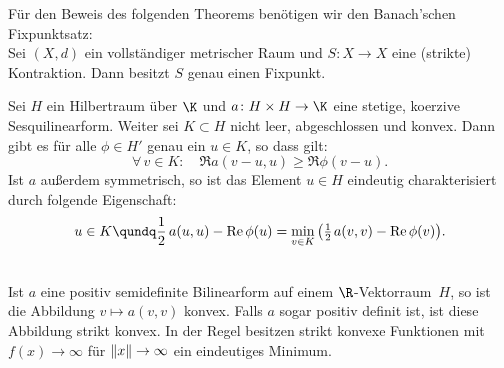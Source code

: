 Für den Beweis des folgenden Theorems benötigen wir den Banach'schen
Fixpunktsatz:\\
\nnSatz Sei $(X,d)$ ein vollständiger metrischer Raum und $S\colon X\to X$ eine
(strikte) Kontraktion. Dann besitzt $S$ genau einen Fixpunkt.

\begin{thTheorem}[Stampacchia]
    Sei $H$ ein Hilbertraum über $\K$ und $a\colon H\times H\to\K$ eine
    stetige, koerzive Sesquilinearform. Weiter sei $K\subset H$ nicht leer,
    abgeschlossen und konvex. Dann gibt es für alle $\phi\in H'$ genau ein
    $u\in K$, so dass gilt:
    \[ \tag{$\star$} \label{vl13:star}
        \forall\,v\in K\colon\quad \Re a(v-u,u) \geq \Re\phi(v-u)  
    . \]
    Ist $a$ außerdem symmetrisch, so ist das Element $u\in H$ eindeutig
    charakterisiert durch folgende Eigenschaft:
    \[ u\in K \qundq \half\,a(u,u) - \Re\phi(u) 
        = \min_{v\in K} \, \bigl( \thalf\mkern2mu a(v,v) - \Re\phi(v) \bigr)
    . \]
\end{thTheorem}

\nnBemerkung\\
Ist $a$ eine positiv semidefinite Bilinearform auf einem $\R$-Vektorraum~$H$, so
ist die Abbildung $v\mapsto a(v,v)$ konvex. Falls $a$ sogar positiv definit ist,
ist diese Abbildung  strikt konvex. In der Regel besitzen strikt konvexe
Funktionen mit $f(x)\to\infty$ für $\lVert x\rVert\to\infty$ ein eindeutiges Minimum.
